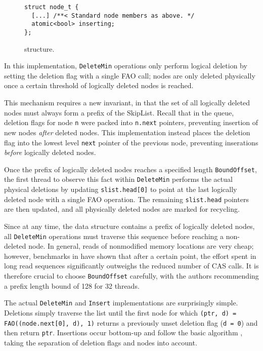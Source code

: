 \documentclass[a4paper,10pt]{article}
\begin{document}
\begin{figure}[h]
\begin{lstlisting}
struct node_t {
  [...] /**< Standard node members as above. */
  atomic<bool> inserting;
};
\end{lstlisting}
\caption{\citeauthor{linden2013skiplist} structure.}
\label{fig:lindensl}
\end{figure}


In this implementation, \lstinline|DeleteMin| operations only perform logical deletion by setting
the deletion flag with a single \ac{FAO} call; nodes are only deleted physically once a certain
threshold of logically deleted nodes is reached.

This mechanism requires a new invariant, in that the set of all logically deleted nodes must always
form a prefix of the SkipList. Recall that in the \citeauthor{sundell2003fast} queue, deletion flags
for node \lstinline|n| were packed into \lstinline|n.next| pointers, preventing insertion of new
nodes \emph{after} deleted nodes. This implementation instead places the deletion flag into the
lowest level \lstinline|next| pointer of the previous node, preventing inserations \emph{before}
logically deleted nodes.

Once the prefix of logically deleted nodes reaches a specified length {\lstset{breaklines,breakatwhitespace} \lstinline|BoundOffset|},
the first thread to observe this fact within \lstinline|DeleteMin| performs the actual physical
deletions by updating \lstinline|slist.head[0]| to point at the last logically deleted node with a
single \ac{FAO} operation. The remaining \lstinline|slist.head| pointers are then updated, and
all physically deleted nodes are marked for recycling.

Since at any time, the data structure contains a prefix of logically deleted nodes, all \lstinline|DeleteMin|
operations must traverse this sequence before reaching a non-deleted node. In general, reads of nonmodified
memory locations are very cheap; however, benchmarks in \cite{linden2013skiplist} have shown that
after a certain point, the effort spent in long read sequences significantly outweighs the reduced
number of \ac{CAS} calls. It is therefore crucial to choose \lstinline|BoundOffset| carefully, with the
authors recommending a prefix length bound of 128 for 32 threads.

The actual \lstinline|DeleteMin| and \lstinline|Insert| implementations are surprisingly simple.
Deletions simply traverse the list until the first node for which \lstinline|(ptr, d) = FAO((node.next[0], d), 1)|
returns a previously unset deletion flag (\lstinline|d = 0|) and then return \lstinline|ptr|.
Insertions occur bottom-up and follow the basic \citeauthor{fraser2004practical} algorithm \cite{fraser2004practical},
taking the separation of deletion flags and nodes into account.
\end{document}
